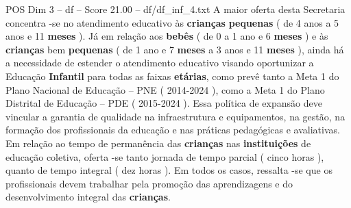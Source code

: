 \begin{textsample}{POS Dim 3 – df – Score 21.00 – df/df\_inf\_4.txt}
A maior oferta desta Secretaria concentra -se no atendimento educativo às \textbf{crianças} \textbf{pequenas} ( de 4 anos a 5 anos e 11 \textbf{meses} ).
Já em relação aos \textbf{bebês} ( de 0 a 1 ano e 6 \textbf{meses} ) e às \textbf{crianças} bem \textbf{pequenas} ( de 1 ano e 7 \textbf{meses} a 3 anos e 11 \textbf{meses} ), ainda há a necessidade de estender o atendimento educativo visando oportunizar a Educação \textbf{Infantil} para todas as faixas \textbf{etárias}, como prevê tanto a Meta 1 do Plano Nacional de Educação – PNE ( 2014-2024 ), como a Meta 1 do Plano Distrital de Educação – PDE ( 2015-2024 ).
Essa política de expansão deve vincular a garantia de qualidade na infraestrutura e equipamentos, na gestão, na formação dos profissionais da educação e nas práticas pedagógicas e avaliativas.
Em relação ao tempo de permanência das \textbf{crianças} nas \textbf{instituições} de educação coletiva, oferta -se tanto jornada de tempo parcial ( cinco horas ), quanto de tempo integral ( dez horas ).
Em todos os casos, ressalta -se que os profissionais devem trabalhar pela promoção das aprendizagens e do desenvolvimento integral das \textbf{crianças}.

\end{textsample}
